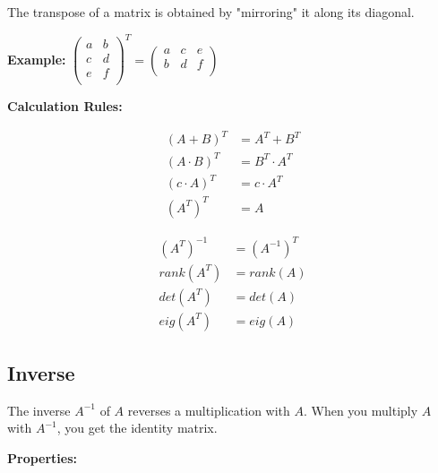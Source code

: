 \documentclass[8pt, a4paper, landscape, includeheadfoot]{extarticle}
\begin{document}
\begin{multicols*}{4}
	The transpose of a matrix is obtained by "mirroring" it along its diagonal.

	\begin{center}
		\textbf{Example:}
		$\begin{pmatrix}
				a & b \\
				c & d \\
				e & f \\
			\end{pmatrix}^T
			=
			\begin{pmatrix}
				a & c & e \\
				b & d & f \\
			\end{pmatrix}$
	\end{center}

	\textbf{Calculation Rules:}

	\vspace{-5mm}
	\begin{minipage}[t]{0.49 \columnwidth}
		\begin{align}
			(A + B)^T     & = A^T + B^T \nonumber     \\
			(A \cdot B)^T & = B^T \cdot A^T \nonumber \\
			(c \cdot A)^T & = c \cdot A^T \nonumber   \\
			(A^T)^T       & = A \nonumber
		\end{align}
	\end{minipage}
	\begin{minipage}[t]{0.49 \columnwidth}
		\begin{align}
			(A^T)^{-1} & = (A^{-1})^T \nonumber \\
			rank(A^T)  & = rank(A) \nonumber    \\
			det(A^T)   & = det(A) \nonumber     \\
			eig(A^T)   & = eig(A) \nonumber
		\end{align}
	\end{minipage}


	\subsection{Inverse}

	The inverse \( A^{-1} \) of \( A \) reverses a multiplication with \( A \). When you multiply \( A \) with \( A^{-1} \), you get the identity matrix.

	\textbf{Properties:}


\end{multicols*}
\end{document}
